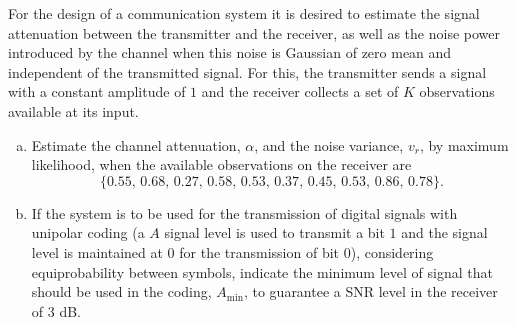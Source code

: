 \begin{prob}
\label{ProbEstCanal}

For the design of a communication system it is desired to estimate the signal attenuation between the transmitter and the receiver, as well as the noise power introduced by the channel when this noise is Gaussian of zero mean and independent of the transmitted signal. For this, the transmitter sends a signal with a constant amplitude of $1$ and the receiver collects a set of $K$ observations available at its input.

\begin{enumerate}[a)]
\item Estimate the channel attenuation, $\alpha$, and the noise variance, $v_r$, by maximum likelihood, when the available observations on the receiver are
$$
\{0.55,\, 0.68,\, 0.27,\, 0.58,\, 0.53,\, 0.37,\, 0.45,\, 0.53,\, 0.86,\, 0.78 \}. 
$$
\item If the system is to be used for the transmission of digital signals with unipolar coding (a $A$ signal level is used to transmit a bit $1$ and the signal level is maintained at $0$ for the transmission of bit $0$), considering equiprobability between symbols, indicate the minimum level of signal that should be used in the coding, $A_{\min}$, to guarantee a SNR level in the receiver of $3$ dB.
\end{enumerate}

\end{prob}

